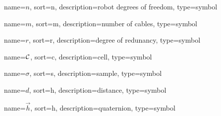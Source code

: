 
	{%
		name=\ensuremath{n},
		sort=n,
		description=robot degrees of freedom,
		type=symbol
	}
	\newcommand{\robotdof}{\gls{sym:robotdof}}

	{%
		name=\ensuremath{m},
		sort=m,
		description=number of cables,
		type=symbol
	}
	\newcommand{\numcables}{\gls{sym:numcables}}

	{%
		name=\ensuremath{r},
		sort=r,
		description=degree of redunancy,
		type=symbol
	}
	\newcommand{\degofredundancy}{\gls{sym:degofredundancy}}

	{%
		name=\ensuremath{\set{C}},
		sort=c,
		description=cell,
		type=symbol
	}
	\newcommand{\cell}{\gls{sym:cell}}

	{%
		name=\ensuremath{\sigma},
		sort=s,
		description=sample,
		type=symbol
	}
	\newcommand{\sample}{\gls{sym:sample}}

	{%
		name=\ensuremath{d},
		sort=h,
		description=distance,
		type=symbol
	}
	\newcommand{\distance}{\gls{sym:distance}}

	{%
		name=\ensuremath{\vec{h}},
		sort=h,
		description=quaternion,
		type=symbol
	}
	\newcommand{\quaternion}{\gls{sym:quaternion}}

